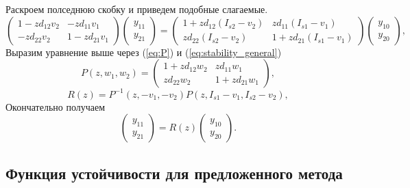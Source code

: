 \documentclass[a4paper,article,14pt]{extarticle}
\begin{document}
Раскроем полседнюю скобку и приведем подобные слагаемые.
\begin{equation}
\begin{pmatrix}
    1 - z d_{12} v_{2} & -z d_{11} v_{1} \\
    -z d_{22} v_{2} & 1 - z d_{21} v_{1}
\end{pmatrix}
\begin{pmatrix} y_{11}\\ y_{21} \end{pmatrix}
=
\begin{pmatrix}
    1 + z d_{12} (I_{s2} - v_{2}) & z d_{11} (I_{s1} - v_{1}) \\
    z d_{22} (I_{s2} - v_{2}) & 1 + z d_{21} (I_{s1} - v_{1})
\end{pmatrix}
\begin{pmatrix} y_{10}\\ y_{20} \end{pmatrix},
\end{equation}
Выразим уравнение выше через (\ref{eq:P}) и (\ref{eq:stability_general})
\begin{equation}
P(z, w_{1}, w_{2}) = 
\begin{pmatrix}
    1 + z d_{12} w_{2} & z d_{11} w_{1} \\
    z d_{22} w_{2} & 1 + z d_{21} w_{1}
\end{pmatrix},
\label{eq:P}
\end{equation}
\begin{equation}
    R(z) = P^{-1}(z , -v_{1}, -v_{2}) P(z, I_{s1} - v_{1}, I_{s2} - v_{2}),
    \label{eq:stability_general}
\end{equation}
Окончательно получаем
\begin{equation}
\begin{pmatrix} y_{11}\\ y_{21} \end{pmatrix}
    = R(z)
\begin{pmatrix} y_{10}\\ y_{20} \end{pmatrix}.
\end{equation}

\subsection{Функция устойчивости для предложенного метода}
\end{document}
